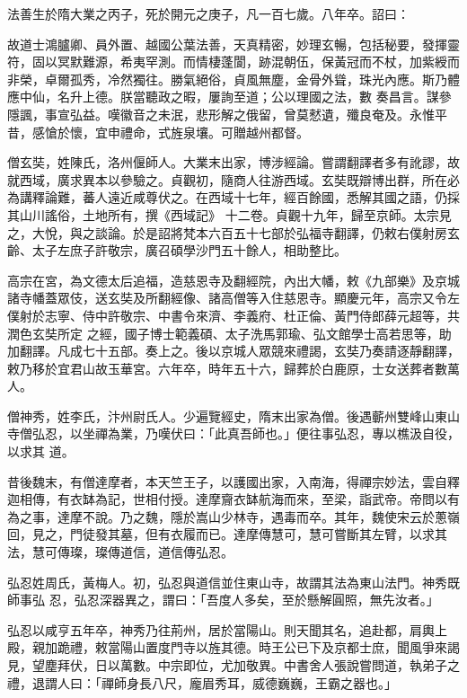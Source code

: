 \begin{pinyinscope}
 法善生於隋大業之丙子，死於開元之庚子，凡一百七歲。八年卒。詔曰：



 故道士鴻臚卿、員外置、越國公葉法善，天真精密，妙理玄暢，包括秘要，發揮靈符，固以冥默難源，希夷罕測。而情棲蓬閬，跡混朝伍，保黃冠而不杖，加紫綬而非榮，卓爾孤秀，冷然獨往。勝氣絕俗，貞風無塵，金骨外聳，珠光內應。斯乃體應中仙，名升上德。朕當聽政之暇，屢詢至道；公以理國之法，數
 奏昌言。謀參隱諷，事宣弘益。嘆徽音之未泯，悲形解之俄留，曾莫憖遺，殲良奄及。永惟平昔，感愴於懷，宜申禮命，式旌泉壤。可贈越州都督。



 僧玄奘，姓陳氏，洛州偃師人。大業末出家，博涉經論。嘗謂翻譯者多有訛謬，故就西域，廣求異本以參驗之。貞觀初，隨商人往游西域。玄奘既辯博出群，所在必為講釋論難，蕃人遠近咸尊伏之。在西域十七年，經百餘國，悉解其國之語，仍採其山川謠俗，土地所有，撰《西域記》
 十二卷。貞觀十九年，歸至京師。太宗見之，大悅，與之談論。於是詔將梵本六百五十七部於弘福寺翻譯，仍敕右僕射房玄齡、太子左庶子許敬宗，廣召碩學沙門五十餘人，相助整比。



 高宗在宮，為文德太后追福，造慈恩寺及翻經院，內出大幡，敕《九部樂》及京城諸寺幡蓋眾伎，送玄奘及所翻經像、諸高僧等入住慈恩寺。顯慶元年，高宗又令左僕射於志寧、侍中許敬宗、中書令來濟、李義府、杜正倫、黃門侍郎薛元超等，共潤色玄奘所定
 之經，國子博士範義碩、太子洗馬郭瑜、弘文館學士高若思等，助加翻譯。凡成七十五部。奏上之。後以京城人眾競來禮謁，玄奘乃奏請逐靜翻譯，敕乃移於宜君山故玉華宮。六年卒，時年五十六，歸葬於白鹿原，士女送葬者數萬人。



 僧神秀，姓李氏，汴州尉氏人。少遍覽經史，隋末出家為僧。後遇蘄州雙峰山東山寺僧弘忍，以坐禪為業，乃嘆伏曰：「此真吾師也。」便往事弘忍，專以樵汲自役，以求其
 道。



 昔後魏末，有僧達摩者，本天竺王子，以護國出家，入南海，得禪宗妙法，雲自釋迦相傳，有衣缽為記，世相付授。達摩齎衣缽航海而來，至梁，詣武帝。帝問以有為之事，達摩不說。乃之魏，隱於嵩山少林寺，遇毒而卒。其年，魏使宋云於蔥嶺回，見之，門徒發其墓，但有衣履而已。達摩傳慧可，慧可嘗斷其左臂，以求其法，慧可傳璨，璨傳道信，道信傳弘忍。



 弘忍姓周氏，黃梅人。初，弘忍與道信並住東山寺，故謂其法為東山法門。神秀既師事弘
 忍，弘忍深器異之，謂曰：「吾度人多矣，至於懸解圓照，無先汝者。」



 弘忍以咸亨五年卒，神秀乃往荊州，居於當陽山。則天聞其名，追赴都，肩輿上殿，親加跪禮，敕當陽山置度門寺以旌其德。時王公已下及京都士庶，聞風爭來謁見，望塵拜伏，日以萬數。中宗即位，尤加敬異。中書舍人張說嘗問道，執弟子之禮，退謂人曰：「禪師身長八尺，龐眉秀耳，威德巍巍，王霸之器也。」




\end{pinyinscope}

